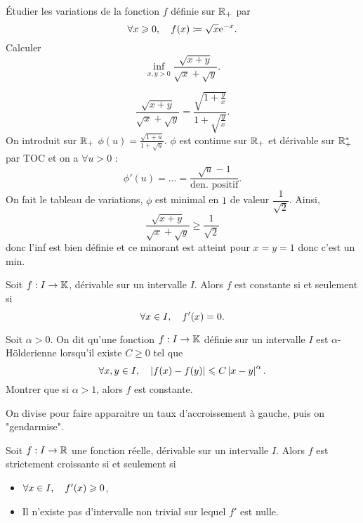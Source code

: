 \documentclass{magnolia}
\begin{document}
\begin{exos}
\exo Étudier les variations de la fonction $f$ définie sur $\mathbb{R}_+$ par
  \[\forall x\geqslant 0 ,\quad f(x)\coloneqq\sqrt{x}{\rm e}^{-x}.\]
\exo Calculer
  \[\inf_{x,y>0} \frac{\sqrt{x+y}}{\sqrt{x}+\sqrt{y}}.\]
  \begin{sol}
  $$\frac{\sqrt{x+y}}{\sqrt{x}+\sqrt{y}}=\frac{\sqrt{1+\frac{y}{x}}}{1+\sqrt{\frac{y}{x}}}.$$
On introduit sur $\mathbb{R}_+$ $\phi(u)=\frac{\sqrt{1+u}}{1+\sqrt{u}}$. $\phi$ est continue sur $\mathbb{R}_+$ et dérivable sur $\mathbb{R}_+^*$ par TOC et on a $\forall u>0$ :
$$\phi'(u)=\ldots=\frac{\sqrt{u}-1}{\text{den. positif}}.$$
On fait le tableau de variations, $\phi$ est minimal en $1$ de valeur $\dfrac{1}{\sqrt{2}}$. Ainsi, $$\frac{\sqrt{x+y}}{\sqrt{x}+\sqrt{y}}\geq \dfrac{1}{\sqrt{2}}$$ donc l'inf est bien définie et ce minorant est atteint pour $x=y=1$ donc c'est un min. 
  \end{sol}
\end{exos}

\begin{proposition}
  Soit $f:I\to\mathbb{K}$, dérivable sur un intervalle $I$. Alors $f$ est constante si et seulement si
    \[\forall x\in I ,\quad f'(x)=0.\]
\end{proposition}

\begin{exoUnique}
  \exo Soit $\alpha>0$. On dit qu'une fonction $f:I\to\mathbb{K}$ définie sur un intervalle
  $I$ est $\alpha$-Hölderienne lorsqu'il existe $C\geq 0$ tel que
  \[\forall x,y\in I ,\quad \left|f(x)-f(y)\right|\leqslant C\left|x-y\right|^\alpha.\]
  Montrer que si $\alpha>1$, alors $f$ est constante.
  \begin{sol}
  On divise pour faire apparaitre un taux d'accroissement à gauche, puis on "gendarmise".
  \end{sol}
\end{exoUnique}

\begin{proposition}[utile=-3]
Soit $f:I\to\mathbb{R}$ une fonction réelle, dérivable sur un intervalle $I$. Alors $f$ est
strictement croissante si et seulement si
\begin{itemize}
\item $\forall x\in I ,\quad f'(x)\geqslant 0$,
\item Il n'existe pas d'intervalle non trivial sur lequel $f'$ est nulle.
\end{itemize}
\end{proposition}
\end{document}
